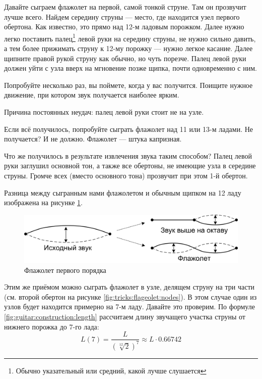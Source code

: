 \begin{Example}
    Давайте сыграем флажолет на первой, самой тонкой струне. Там он прозвучит лучше всего. Найдем середину струны --- место, где находится узел первого обертона. Как известно, это прямо над 12-м ладовым порожком. Далее нужно легко поставить палец\footnote{Обычно указательный или средний, какой лучше слушается} левой руки на середину струны, не нужно сильно давить, а тем более прижимать струну к 12-му порожку --- нужно легкое касание. Далее щипните правой рукой струну как обычно, но чуть порезче. Палец левой руки должен уйти с узла вверх на мгновение позже щипка, почти одновременно с ним.
    
    Попробуйте несколько раз, вы поймете, когда у вас получится. Поищите нужное движение, при котором звук получается наиболее ярким.
    
    Причина постоянных неудач: палец левой руки стоит не на узле. 
    
    Если всё получилось, попробуйте сыграть флажолет над 11 или 13-м ладами. Не получается? И не должно. Флажолет --- штука капризная.
    
    Что же получилось в результате извлечения звука таким способом? Палец левой руки заглушил основной тон, а также все обертоны, не имеющие узла в середине струны. Громче всех (вместо основного тона) прозвучит при этом 1-й обертон.
    
    Разница между сыгранным нами флажолетом и обычным щипком на 12 ладу изображена на рисунке \ref{fig:tricks:flageolet:first}.
\end{Example}
 
\begin{figure}[!ht]
    \centering
    \includegraphics{fig/string-flageolet} 
    \caption{Флажолет первого порядка}\label{fig:tricks:flageolet:first}
\end{figure} 

Этим же приёмом можно сыграть флажолет в узле, делящем струну на три части (см. второй обертон на рисунке \ref{fig:tricks:flageolet:nodes}). В этом случае один из узлов будет находится примерно на 7-м ладу. Давайте это проверим. По формуле \ref{fig:guitar:construction:length} рассчитаем длину звучащего участка струны от нижнего порожка до 7-го лада:
\[
    L(7)=\frac{L}{(\sqrt[12]{2})^7}\approx L\cdot 0.66742
\]

